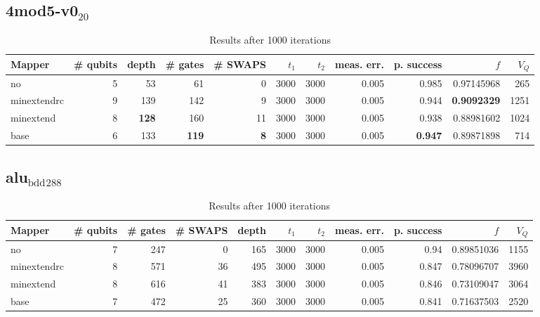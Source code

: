 \documentclass[11pt]{article}
\begin{document}
\subsection{4mod5-v0\(_{\text{20}}\)}
\label{sec:orgb448534}
\begin{table}[!htpb]
\caption{\label{tab:org7410de5}
Results after 1000 iterations}
\centering
\begin{tabular}{lrrrrrrrrrr}
\hline
Mapper & \# qubits & depth & \# gates & \# SWAPS & \(t_1\) & \(t_2\) & meas. err. & p. success & \(f\) & \(V_Q\)\\
\hline
no & 5 & 53 & 61 & 0 & 3000 & 3000 & 0.005 & 0.985 & 0.97145968 & 265\\
\hline
minextendrc & 9 & 139 & 142 & 9 & 3000 & 3000 & 0.005 & 0.944 & \textbf{0.9092329} & 1251\\
minextend & 8 & \textbf{128} & 160 & 11 & 3000 & 3000 & 0.005 & 0.938 & 0.88981602 & 1024\\
base & 6 & 133 & \textbf{119} & \textbf{8} & 3000 & 3000 & 0.005 & \textbf{0.947} & 0.89871898 & 714\\
\hline
\end{tabular}
\end{table}

\subsection{alu\(_{\text{bdd}}\)\(_{\text{288}}\)}
\label{sec:orgc39cfb3}

\begin{table}[!htpb]
\caption{\label{tab:org1c6a3fb}
Results after 1000 iterations}
\centering
\begin{tabular}{lrrrrrrrrrr}
\hline
Mapper & \# qubits & \# gates & \# SWAPS & depth & \(t_1\) & \(t_2\) & meas. err. & p. success & \(f\) & \(V_Q\)\\
\hline
no & 7 & 247 & 0 & 165 & 3000 & 3000 & 0.005 & 0.94 & 0.89851036 & 1155\\
\hline
minextendrc & 8 & 571 & 36 & 495 & 3000 & 3000 & 0.005 & 0.847 & 0.78096707 & 3960\\
minextend & 8 & 616 & 41 & 383 & 3000 & 3000 & 0.005 & 0.846 & 0.73109047 & 3064\\
base & 7 & 472 & 25 & 360 & 3000 & 3000 & 0.005 & 0.841 & 0.71637503 & 2520\\
\hline
\end{tabular}
\end{table}
\end{document}
